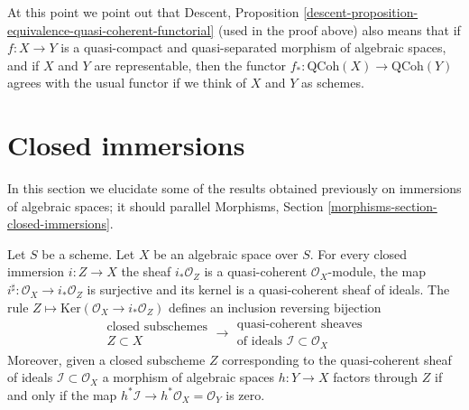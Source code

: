 \noindent
At this point we point out that
Descent,
Proposition \ref{descent-proposition-equivalence-quasi-coherent-functorial}
(used in the proof above) also means that if $f : X \to Y$ is a
quasi-compact and quasi-separated morphism of algebraic spaces, and
if $X$ and $Y$ are representable, then the functor
$f_* : \text{QCoh}(X) \to \text{QCoh}(Y)$ agrees with the
usual functor if we think of $X$ and $Y$ as schemes.






\section{Closed immersions}
\label{section-closed-immersions}

\noindent
In this section we elucidate some of the results obtained previously on
immersions of algebraic spaces; it should parallel
Morphisms, Section \ref{morphisms-section-closed-immersions}.

\begin{lemma}
\label{lemma-closed-immersion-ideals}
Let $S$ be a scheme.
Let $X$ be an algebraic space over $S$.
For every closed immersion $i : Z \to X$ the sheaf
$i_*\mathcal{O}_Z$ is a quasi-coherent $\mathcal{O}_X$-module, the map
$i^\sharp : \mathcal{O}_X \to i_*\mathcal{O}_Z$ is surjective and its
kernel is a quasi-coherent sheaf of ideals. The rule
$Z \mapsto \text{Ker}(\mathcal{O}_X \to i_*\mathcal{O}_Z)$
defines an inclusion reversing bijection
$$
\begin{matrix}
\text{closed subschemes}\\
Z \subset X
\end{matrix}
\longrightarrow
\begin{matrix}
\text{quasi-coherent sheaves}\\
\text{of ideals }\mathcal{I} \subset \mathcal{O}_X
\end{matrix}
$$
Moreover, given a closed subscheme $Z$ corresponding to the quasi-coherent
sheaf of ideals $\mathcal{I} \subset \mathcal{O}_X$ a morphism of algebraic
spaces $h : Y \to X$ factors through $Z$ if and only if the map
$h^*\mathcal{I} \to h^*\mathcal{O}_X = \mathcal{O}_Y$ is zero.
\end{lemma}

